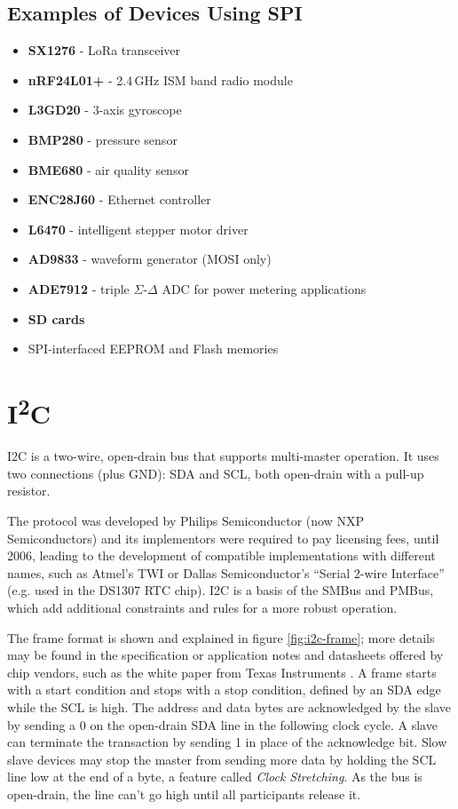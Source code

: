 \pagebreak[1] %
\subsection{Examples of Devices Using SPI}

\begin{itemize}
	\item \textbf{SX1276} - LoRa transceiver
	\item \textbf{nRF24L01+} - 2.4\,GHz ISM band radio module
	\item \textbf{L3GD20} - 3-axis gyroscope
	\item \textbf{BMP280} - pressure sensor
	\item \textbf{BME680} - air quality sensor
	\item \textbf{ENC28J60} - Ethernet controller
	\item \textbf{L6470} - intelligent stepper motor driver
	\item \textbf{AD9833} - waveform generator (\gls{MOSI} only)
	\item \textbf{ADE7912} - triple $\Sigma$-$\Delta$ \gls{ADC} for power metering applications
	\item \textbf{SD cards} \cite{sd-spec}
	\item SPI-interfaced EEPROM and Flash memories
\end{itemize}

\section{I\textsuperscript{2}C} \label{sec:theory-i2c}

\acrfull{I2C} is a two-wire, open-drain bus that supports multi-master operation. 
It uses two connections (plus \gls{GND}): \gls{SDA} and \gls{SCL}, both open-drain with a pull-up resistor. 

The protocol was developed by Philips Semiconductor (now NXP Semiconductors) and its implementors were required to pay licensing fees, until 2006, leading to the development of compatible implementations with different names, such as Atmel's \gls{TWI} or Dallas Semiconductor's ``Serial 2-wire Interface'' (e.g. used in the DS1307 \gls{RTC} chip). \gls{I2C} is a basis of the \gls{SMBus} and \gls{PMBus}, which add additional constraints and rules for a more robust operation.

The frame format is shown and explained in figure \ref{fig:i2c-frame}; more details may be found in the specification \cite{i2c-spec} or application notes and datasheets offered by chip vendors, such as the white paper from Texas Instruments \cite{understanding-i2c}. A frame starts with a start condition and stops with a stop condition, defined by an \gls{SDA} edge while the \gls{SCL} is high. The address and data bytes are acknowledged by the slave by sending a 0 on the open-drain \gls{SDA} line in the following clock cycle. A slave can terminate the transaction by sending 1 in place of the acknowledge bit. Slow slave devices may stop the master from sending more data by holding the SCL line low at the end of a byte, a feature called \textit{Clock Stretching}. As the bus is open-drain, the line can't go high until all participants release it.

